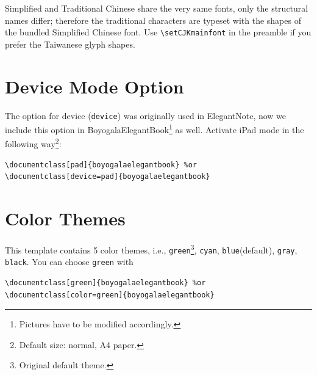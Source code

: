 \documentclass[11pt]{boyogalaelegantbook}
\begin{document}
\begin{remark}
Simplified and Traditional Chinese share the very same fonts, only the
structural names differ; therefore the traditional characters are typeset with
the shapes of the bundled Simplified Chinese font.  Use
\lstinline|\setCJKmainfont| in the preamble if you prefer the Taiwanese
glyph shapes.
\end{remark}

\section{Device Mode Option}
The option for device (\lstinline{device}) was originally used in ElegantNote, now we include this option in BoyogalaElegantBook\footnote{Pictures have to be modified accordingly.} as well. Activate iPad mode in the following way\footnote{Default size: normal, A4 paper.}:
\begin{lstlisting}
\documentclass[pad]{boyogalaelegantbook} %or
\documentclass[device=pad]{boyogalaelegantbook}
\end{lstlisting}

\section{Color Themes}
This template contains 5 color themes, i.e., \textcolor{structure1}{\lstinline{green}}\footnote{Original default theme.}, \textcolor{structure2}{\lstinline{cyan}}, \textcolor{structure3}{\lstinline{blue}}(default), \textcolor{structure4}{\lstinline{gray}}, \textcolor{structure5}{\lstinline{black}}. You can choose \lstinline{green} with
\begin{lstlisting}
\documentclass[green]{boyogalaelegantbook} %or
\documentclass[color=green]{boyogalaelegantbook}
\end{lstlisting}
\end{document}
